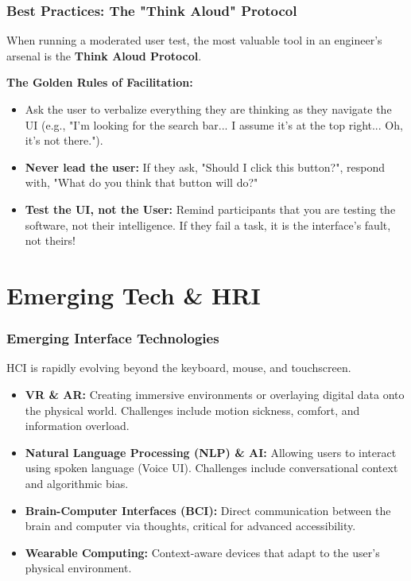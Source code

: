 \documentclass[xcolor=table]{beamer}
\begin{document}
\begin{frame}
    \frametitle{Best Practices: The "Think Aloud" Protocol}
    When running a moderated user test, the most valuable tool in an engineer's arsenal is the \textbf{Think Aloud Protocol}.
    
    \vspace{0.3cm}
    \textbf{The Golden Rules of Facilitation:}
    \begin{itemize}
        \item Ask the user to verbalize everything they are thinking as they navigate the UI (e.g., "I'm looking for the search bar... I assume it's at the top right... Oh, it's not there.").
        \item \textbf{Never lead the user:} If they ask, "Should I click this button?", respond with, "What do you think that button will do?"
        \item \textbf{Test the UI, not the User:} Remind participants that you are testing the software, not their intelligence. If they fail a task, it is the interface's fault, not theirs!
    \end{itemize}
\end{frame}

\section{Emerging Tech \& HRI}

\begin{frame}
    \frametitle{Emerging Interface Technologies}
    HCI is rapidly evolving beyond the keyboard, mouse, and touchscreen.
    
    \begin{itemize}
        \item \textbf{VR \& AR:} Creating immersive environments or overlaying digital data onto the physical world. Challenges include motion sickness, comfort, and information overload.
        \item \textbf{Natural Language Processing (NLP) \& AI:} Allowing users to interact using spoken language (Voice UI). Challenges include conversational context and algorithmic bias.
        \item \textbf{Brain-Computer Interfaces (BCI):} Direct communication between the brain and computer via thoughts, critical for advanced accessibility.
        \item \textbf{Wearable Computing:} Context-aware devices that adapt to the user's physical environment.
    \end{itemize}
\end{frame}
\end{document}
